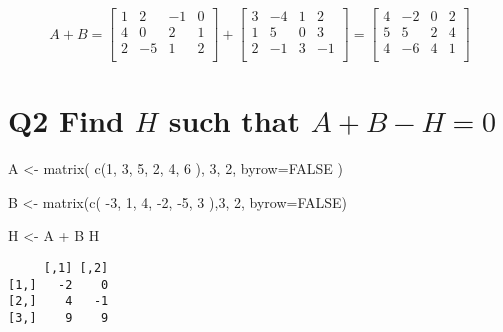 \documentclass[
  letterpaper,
  DIV=11,
  numbers=noendperiod]{scrartcl}
\newenvironment{Shaded}{\begin{snugshade}}{\end{snugshade}}
\newcommand{\AttributeTok}[1]{\textcolor[rgb]{0.40,0.45,0.13}{#1}}
\newcommand{\ConstantTok}[1]{\textcolor[rgb]{0.56,0.35,0.01}{#1}}
\newcommand{\DecValTok}[1]{\textcolor[rgb]{0.68,0.00,0.00}{#1}}
\newcommand{\FunctionTok}[1]{\textcolor[rgb]{0.28,0.35,0.67}{#1}}
\newcommand{\NormalTok}[1]{\textcolor[rgb]{0.00,0.23,0.31}{#1}}
\newcommand{\OtherTok}[1]{\textcolor[rgb]{0.00,0.23,0.31}{#1}}
\newcommand{\SpecialCharTok}[1]{\textcolor[rgb]{0.37,0.37,0.37}{#1}}
\begin{document}
\[
A + B = \begin{bmatrix}
1 & 2 & -1 & 0 \\
4 & 0 & 2 & 1 \\
2 & -5 & 1 & 2 \\
\end{bmatrix} + \begin{bmatrix}
3 & -4 & 1 & 2 \\
1 & 5 & 0 & 3 \\
2 & -1 & 3 & -1 \\
\end{bmatrix} = \begin{bmatrix}
4 & -2 & 0 & 2 \\
5 & 5 & 2 & 4 \\
4 & -6 & 4 & 1 \\
\end{bmatrix}
\]

\hypertarget{q2-find-h-such-that-a-b---h-0}{%
\section{\texorpdfstring{Q2 Find \(H\) such that
\(A + B - H = 0\)}{Q2 Find H such that A + B - H = 0}}\label{q2-find-h-such-that-a-b---h-0}}

\begin{Shaded}
\begin{Highlighting}[]
\NormalTok{A }\OtherTok{\textless{}{-}} \FunctionTok{matrix}\NormalTok{(}
  \FunctionTok{c}\NormalTok{(}\DecValTok{1}\NormalTok{, }\DecValTok{3}\NormalTok{, }\DecValTok{5}\NormalTok{,}
    \DecValTok{2}\NormalTok{, }\DecValTok{4}\NormalTok{, }\DecValTok{6}
\NormalTok{  ), }\DecValTok{3}\NormalTok{, }\DecValTok{2}\NormalTok{, }\AttributeTok{byrow=}\ConstantTok{FALSE}
\NormalTok{)}

\NormalTok{B }\OtherTok{\textless{}{-}} \FunctionTok{matrix}\NormalTok{(}\FunctionTok{c}\NormalTok{(}
  \SpecialCharTok{{-}}\DecValTok{3}\NormalTok{, }\DecValTok{1}\NormalTok{, }\DecValTok{4}\NormalTok{,}
  \SpecialCharTok{{-}}\DecValTok{2}\NormalTok{, }\SpecialCharTok{{-}}\DecValTok{5}\NormalTok{, }\DecValTok{3}
\NormalTok{),}\DecValTok{3}\NormalTok{, }\DecValTok{2}\NormalTok{, }\AttributeTok{byrow=}\ConstantTok{FALSE}\NormalTok{)}

\NormalTok{H }\OtherTok{\textless{}{-}}\NormalTok{ A }\SpecialCharTok{+}\NormalTok{ B}
\NormalTok{H}
\end{Highlighting}
\end{Shaded}

\begin{verbatim}
     [,1] [,2]
[1,]   -2    0
[2,]    4   -1
[3,]    9    9
\end{verbatim}
\end{document}
